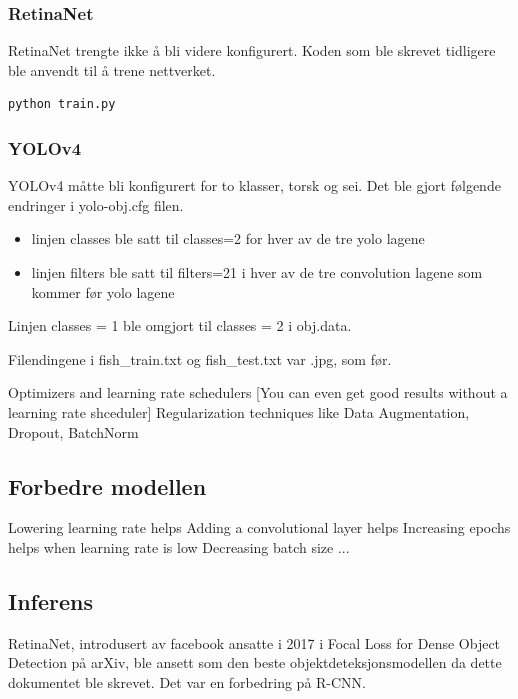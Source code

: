 \subsubsection{RetinaNet}

RetinaNet trengte ikke å bli videre konfigurert. Koden som ble skrevet tidligere ble anvendt til å trene nettverket.

\begin{verbatim}
python train.py
\end{verbatim}

\subsubsection{YOLOv4}

YOLOv4 måtte bli konfigurert for to klasser, torsk og sei. Det ble gjort følgende endringer i yolo-obj.cfg filen.

\begin{itemize}
  \item linjen classes ble satt til classes=2 for hver av de tre yolo lagene
  \item linjen filters ble satt til filters=21 i hver av de tre convolution lagene som kommer før yolo lagene
\end{itemize}

Linjen classes = 1 ble omgjort til classes = 2 i obj.data. 

Filendingene i fish\_train.txt og fish\_test.txt var .jpg, som før.

Optimizers and learning rate schedulers [You can even get good results without a learning rate shceduler]
Regularization techniques like Data Augmentation, Dropout, BatchNorm

\subsection{Forbedre modellen}

Lowering learning rate helps
Adding a convolutional layer helps
Increasing epochs helps when learning rate is low
Decreasing batch size ...

\subsection{Inferens}

RetinaNet, introdusert av facebook ansatte i 2017 i Focal Loss for Dense Object Detection på arXiv, ble ansett som den beste objektdeteksjonsmodellen da dette dokumentet ble skrevet. Det var en forbedring på R-CNN. \cite{Lin m.fl. 2017}


